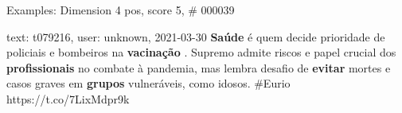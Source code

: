 \begin{frame}{Examples: Dimension 4 pos, score 5, \# 000039}
\footnotesize
\begin{exampleblock}{text: t079216, user: unknown, 2021-03-30}
\textbf{Saúde} é quem decide prioridade de policiais e bombeiros na 
\textbf{vacinação} . Supremo admite riscos e papel crucial dos 
\textbf{profissionais} no combate à pandemia, mas lembra desafio de 
\textbf{evitar} mortes e casos graves em \textbf{grupos} vulneráveis, como 
idosos. \#Eurio https://t.co/7LixMdpr9k 
\end{exampleblock}
\end{frame}
